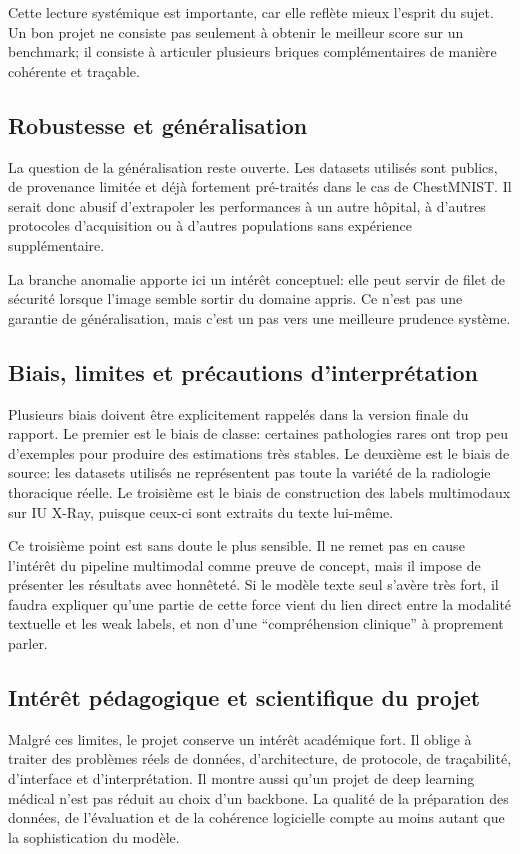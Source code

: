 \documentclass[11pt,a4paper]{article}
\begin{document}
Cette lecture syst\'emique est importante, car elle refl\`ete mieux l'esprit du sujet. Un bon projet ne consiste pas seulement \`a obtenir le meilleur score sur un benchmark; il consiste \`a articuler plusieurs briques compl\'ementaires de mani\`ere coh\'erente et tra\c{c}able.

\subsection{Robustesse et g\'en\'eralisation}
La question de la g\'en\'eralisation reste ouverte. Les datasets utilis\'es sont publics, de provenance limit\'ee et d\'ej\`a fortement pr\'e-trait\'es dans le cas de ChestMNIST. Il serait donc abusif d'extrapoler les performances \`a un autre h\^opital, \`a d'autres protocoles d'acquisition ou \`a d'autres populations sans exp\'erience suppl\'ementaire.

La branche anomalie apporte ici un int\'er\^et conceptuel: elle peut servir de filet de s\'ecurit\'e lorsque l'image semble sortir du domaine appris. Ce n'est pas une garantie de g\'en\'eralisation, mais c'est un pas vers une meilleure prudence syst\`eme.

\subsection{Biais, limites et pr\'ecautions d'interpr\'etation}
Plusieurs biais doivent \^etre explicitement rappel\'es dans la version finale du rapport. Le premier est le biais de classe: certaines pathologies rares ont trop peu d'exemples pour produire des estimations tr\`es stables. Le deuxi\`eme est le biais de source: les datasets utilis\'es ne repr\'esentent pas toute la vari\'et\'e de la radiologie thoracique r\'eelle. Le troisi\`eme est le biais de construction des labels multimodaux sur IU X-Ray, puisque ceux-ci sont extraits du texte lui-m\^eme.

Ce troisi\`eme point est sans doute le plus sensible. Il ne remet pas en cause l'int\'er\^et du pipeline multimodal comme preuve de concept, mais il impose de pr\'esenter les r\'esultats avec honn\^etet\'e. Si le mod\`ele texte seul s'av\`ere tr\`es fort, il faudra expliquer qu'une partie de cette force vient du lien direct entre la modalit\'e textuelle et les weak labels, et non d'une ``compr\'ehension clinique'' \`a proprement parler.

\subsection{Int\'er\^et p\'edagogique et scientifique du projet}
Malgr\'e ces limites, le projet conserve un int\'er\^et acad\'emique fort. Il oblige \`a traiter des probl\`emes r\'eels de donn\'ees, d'architecture, de protocole, de tra\c{c}abilit\'e, d'interface et d'interpr\'etation. Il montre aussi qu'un projet de deep learning m\'edical n'est pas r\'eduit au choix d'un backbone. La qualit\'e de la pr\'eparation des donn\'ees, de l'\'evaluation et de la coh\'erence logicielle compte au moins autant que la sophistication du mod\`ele.
\end{document}
